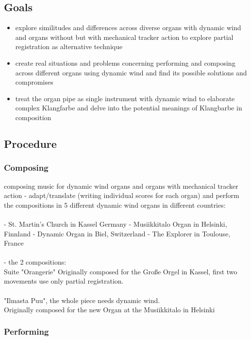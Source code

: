 \subsection{Goals}

\begin{itemize}
\item explore similitudes and differences across diverse organs with dynamic wind and organs without but with mechanical tracker action to explore partial registration as alternative technique
\item create real situations and problems concerning performing and composing across different organs using dynamic wind and find its possible solutions and compromises
\item treat the organ pipe as single instrument with dynamic wind to elaborate complex Klangfarbe and delve into the potential meanings of Klangbarbe in composition
\end{itemize}

\subsection{Procedure}

\subsubsection{Composing} 
composing music for dynamic wind organs and organs with mechanical tracker action 
- adapt/translate (writing individual scores for each organ) and perform the compositions in 5 different dynamic wind organs in different countries: \\
\\
- St. Martin's Church in Kassel Germany
- Musiikkitalo Organ in Helsinki, Finnland
- Dynamic Organ in Biel, Switzerland
- The Explorer in Toulouse, France\\
\\
- the 2 compositions: 
\\
Suite "Orangerie" 
Originally composed for the Große Orgel in Kassel, first two movements use only partial registration.\\
\\
"Ilmasta Puu", the whole piece needs dynamic wind.\\
Originally composed for the new Organ at the Musiikkitalo in Helsinki\\

\subsubsection{Performing} 

